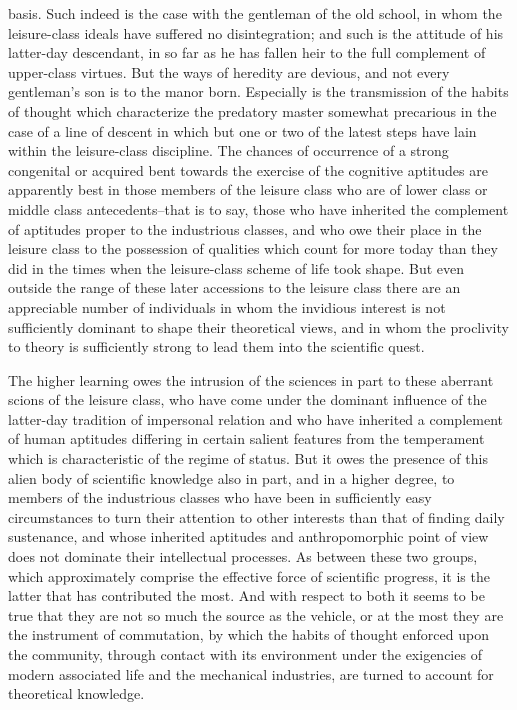 \documentclass[12pt]{report}
\begin{document}
basis. Such indeed is the case with the gentleman of the old school, in
whom the leisure-class ideals have suffered no disintegration; and such
is the attitude of his latter-day descendant, in so far as he has fallen
heir to the full complement of upper-class virtues. But the ways of
heredity are devious, and not every gentleman's son is to the manor
born. Especially is the transmission of the habits of thought which
characterize the predatory master somewhat precarious in the case of a
line of descent in which but one or two of the latest steps have lain
within the leisure-class discipline. The chances of occurrence of a
strong congenital or acquired bent towards the exercise of the cognitive
aptitudes are apparently best in those members of the leisure class who
are of lower class or middle class antecedents--that is to say, those
who have inherited the complement of aptitudes proper to the industrious
classes, and who owe their place in the leisure class to the possession
of qualities which count for more today than they did in the times when
the leisure-class scheme of life took shape. But even outside the range
of these later accessions to the leisure class there are an appreciable
number of individuals in whom the invidious interest is not sufficiently
dominant to shape their theoretical views, and in whom the proclivity to
theory is sufficiently strong to lead them into the scientific quest.

The higher learning owes the intrusion of the sciences in part to these
aberrant scions of the leisure class, who have come under the dominant
influence of the latter-day tradition of impersonal relation and who
have inherited a complement of human aptitudes differing in certain
salient features from the temperament which is characteristic of
the regime of status. But it owes the presence of this alien body of
scientific knowledge also in part, and in a higher degree, to members of
the industrious classes who have been in sufficiently easy circumstances
to turn their attention to other interests than that of finding daily
sustenance, and whose inherited aptitudes and anthropomorphic point of
view does not dominate their intellectual processes. As between
these two groups, which approximately comprise the effective force of
scientific progress, it is the latter that has contributed the most. And
with respect to both it seems to be true that they are not so much
the source as the vehicle, or at the most they are the instrument of
commutation, by which the habits of thought enforced upon the community,
through contact with its environment under the exigencies of modern
associated life and the mechanical industries, are turned to account for
theoretical knowledge.
\end{document}
